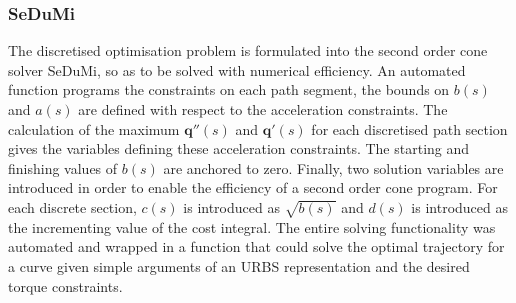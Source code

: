 \subsubsection{SeDuMi}

The discretised optimisation problem is formulated into the second order cone solver SeDuMi, so as to be solved with numerical efficiency. An automated function programs the constraints on each path segment, the bounds on $b(s)$ and $a(s)$ are defined with respect to the acceleration constraints. The calculation of the maximum $\textbf{q}''(s)$ and $\textbf{q}'(s)$ for each discretised path section gives the variables defining these acceleration constraints. The starting and finishing values of $b(s)$ are anchored to zero. Finally, two solution variables are introduced in order to enable the efficiency of a second order cone program. For each discrete section, $c(s)$ is introduced as $\sqrt{b(s)}$ and $d(s)$ is introduced as the incrementing value of the cost integral.
The entire solving functionality was automated and wrapped in a function that could solve the optimal trajectory for a curve  given simple arguments of an URBS representation and the desired torque constraints.
